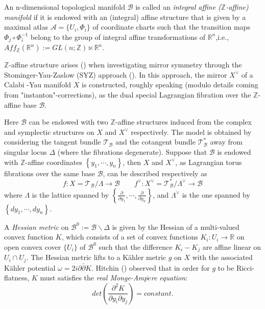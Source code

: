 \documentclass{article}
\begin{document}
\begin{definition}
 An n-dimensional topological manifold $\mathcal{B}$ is called an \textit{integral affine ($\mathbb{Z}$-affine) manifold} if it is endowed with an (integral) affine structure  that is given by a maximal atlas $\mathcal{A}=\{U_{i},\Phi_{i}\}$ of coordinate charts such that the transition maps $\Phi_{j}\circ\Phi_{i}^{-1}$ belong to the group of integral affine transformations of $\mathbb{R}^{n}$,i.e.,$Aff_{\mathbb{Z}}(\mathbb{R}^{n}):=GL(n;\mathbb{Z})\ltimes\mathbb{R}^{n}$.
 \end{definition}

$\mathbb{Z}$-affine structure arises (\cite{gross2011real}\cite{gross2003affine}\cite{leung2005mirror}) when investigating mirror symmetry through the Stominger-Yau-Zaslow (SYZ) approach (\cite{strominger1996mirror}). In this approach, the mirror $X^{\vee}$ of a Calabi -Yau manifold $X$ is constructed, roughly speaking (modulo details coming from "instanton"-corrections), as the dual special Lagrangian fibration over the $\mathbb{Z}$-affine base $\mathcal{B}$.

Here $\mathcal{B}$ can be endowed with two $\mathbb{Z}$-affine structures induced from the complex and symplectic structures on $X$ and $X^{\vee}$ respectively. The model is obtained by considering the tangent bundle $\mathcal{T}_{\mathcal{B}}$ and the cotangent bundle $\mathcal{T}^{*}_{\mathcal{B}}$ away from singular locus $\Delta$ (where the fibrations degenerate). Suppose that $\mathcal{B}$ is endowed with $\mathbb{Z}$-affine coordinates $\left\{y_{1},\cdots,y_{n}\right\}$, then $X$ and $X^{\vee}$, as Lagrangian torus fibrations over the same base $\mathcal{B}$, can be described respectively as
 \[f:X=\mathcal{T}_{\mathcal{B}}/\Lambda\longrightarrow \mathcal{B}\qquad f^{\vee}:X^{\vee}=\mathcal{T}^{*}_{\mathcal{B}}/\Lambda^{\vee}\longrightarrow \mathcal{B}\]
where $\Lambda$ is the lattice spanned by $\left\{\frac{\partial}{\partial y_{1}},\cdots,\frac{\partial}{\partial y_{n}}\right\}$, and $\Lambda^{\vee}$ is the one spanned by $\left\{dy_{1},\cdots,dy_{n}\right\}$.

A \textit{Hessian metric} on $\mathcal{B}^{0}:=\mathcal{B}\backslash\Delta$ is given by the Hessian of a multi-valued convex function $K$, which consists of a set of convex functions $K_{i}:U_{i}\rightarrow\mathbb{R}$ on open convex cover $\{U_{i}\}$ of $\mathcal{B}^{0}$ such that the difference $K_{i}-K_{j}$ are affine linear on $U_{i}\cap U_{j}$. The Hessian metric lifts to a K\"ahler metric $g$ on $X$ with the associated K\"ahler potential $\omega=2i\partial\bar{\partial}K$. 
Hitchin (\cite{hitchin1997moduli}) observed that in order for $g$ to be Ricci-flatness, $K$ must satisfies the \textit{real Monge-Amp$\grave{e}$re equation}:
\[det\left(\frac{\partial^{2}K}{\partial y_{i}\partial y_{j}}\right)=constant.\]
\end{document}
